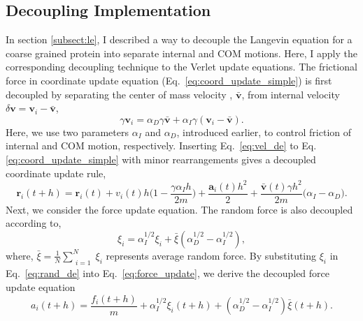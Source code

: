\documentclass[../talant.diss.submit.tex]{subfiles}
\begin{document}
\subsection{\textbf{Decoupling Implementation}}
In section \ref{subsect:le}, I described a way to decouple the Langevin equation for a coarse grained
protein into separate internal and COM motions. Here, I apply the corresponding decoupling
technique to the Verlet update equations.   
The frictional force in coordinate update equation (Eq.~\ref{eq:coord_update_simple}) is first decoupled
by separating the center of mass velocity , $\bm{\bar v}$, from internal velocity
$\delta{\bm{v}} = \bm{v}_i - \bm{\bar v}$, 
%
%
\begin{equation}
  \label{eq:vel_de}
  \gamma \bm{v}_{i} = \alpha_{D}\gamma \bm{\bar v} + \alpha_{I} \gamma (\bm{v}_{i} - \bm{\bar v}).
\end{equation}
%
%
Here, we use two parameters $\alpha_I$ and $\alpha_D$, introduced earlier, to control friction of internal and
COM motion, respectively. Inserting Eq.~\ref{eq:vel_de} to Eq.\ref{eq:coord_update_simple} with minor rearrangements
gives a decoupled coordinate update rule,
%
%
\begin{equation}
  \label{eq:coord_update_de}
  \bm{r}_{i}(t+h) = \bm{r}_{i}(t) + v_{i}(t)h \Big(1 - \frac{\gamma \alpha_{I} h}{2m} \Big) +
  \frac{\bm{a}_{i}(t) h^2}{2} + \frac{\bm{\bar v}(t) \gamma h^2}{2m} \big( \alpha_{I} - \alpha_{D} \big).
\end{equation}
%
%
Next, we consider the force update equation. The random force is also decoupled according to,
\begin{equation}
  \label{eq:rand_de}
  \xi_{i} = %
  \alpha_{I}^{1/2} \xi_{i} + \bar \xi (\alpha_{D}^{1/2} - \alpha_{I}^{1/2}),
\end{equation}
%
where, $\bar{\xi} = \frac{1}{N} \sum_{\substack{i=1}}^{N} \xi_i$ represents average random force.
By substituting $\xi_i$ in Eq.~\ref{eq:rand_de} into Eq.~\ref{eq:force_update}, we derive the decoupled
force update equation
%
%
\begin{equation}
  \label{eq:force_update_de}
  a_{i}(t+h) = \frac{f_{i}(t+h)}{m} + \alpha_{I}^{1/2} \xi_{i}(t+h) +
  (\alpha_{D}^{1/2} - \alpha_{I}^{1/2}) \bar \xi(t+h). 
\end{equation}
\end{document}
